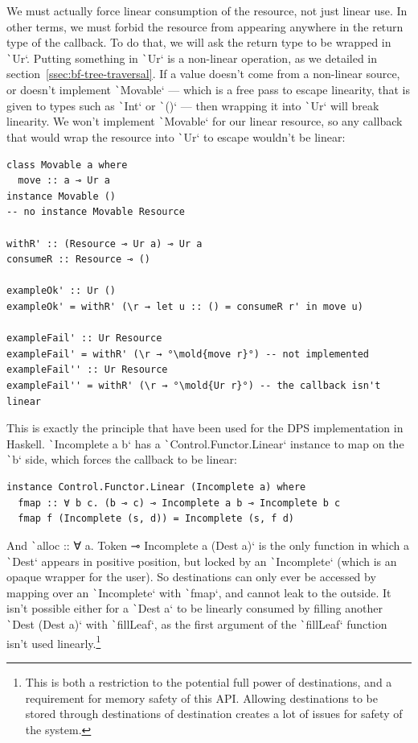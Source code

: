 \documentclass[english]{jflart}
\newcommand{\mold}[1]{\colorbox{red}{#1}}
\begin{document}
We must actually force linear consumption of the resource, not just linear use. In other terms, we must forbid the resource from appearing anywhere in the return type of the callback. To do that, we will ask the return type to be wrapped in \texttt`Ur`. Putting something in \texttt`Ur` is a non-linear operation, as we detailed in section~\ref{ssec:bf-tree-traversal}. If a value doesn't come from a non-linear source, or doesn't implement \texttt`Movable` --- which is a free pass to escape linearity, that is given to types such as \texttt`Int` or \texttt`()` --- then wrapping it into \texttt`Ur` will break linearity. We won't implement \texttt`Movable` for our linear resource, so any callback that would wrap the resource into \texttt`Ur` to escape wouldn't be linear:
{\small
\begin{verbatim}
class Movable a where
  move :: a ⊸ Ur a
instance Movable ()
-- no instance Movable Resource

withR' :: (Resource ⊸ Ur a) ⊸ Ur a
consumeR :: Resource ⊸ ()

exampleOk' :: Ur ()
exampleOk' = withR' (\r → let u :: () = consumeR r' in move u)

exampleFail' :: Ur Resource
exampleFail' = withR' (\r → °\mold{move r}°) -- not implemented
exampleFail'' :: Ur Resource
exampleFail'' = withR' (\r → °\mold{Ur r}°) -- the callback isn't linear
\end{verbatim}
}

This is exactly the principle that have been used for the DPS implementation in Haskell. \texttt`Incomplete a b` has a \texttt`Control.Functor.Linear` instance to map on the \texttt`b` side, which forces the callback to be linear:

{\small
\begin{verbatim}
instance Control.Functor.Linear (Incomplete a) where
  fmap :: ∀ b c. (b ⊸ c) ⊸ Incomplete a b ⊸ Incomplete b c
  fmap f (Incomplete (s, d)) = Incomplete (s, f d)
\end{verbatim}
}

And \texttt`alloc :: ∀ a. Token ⊸ Incomplete a (Dest a)` is the only function in which a \texttt`Dest` appears in positive position, but locked by an \texttt`Incomplete` (which is an opaque wrapper for the user). So destinations can only ever be accessed by mapping over an \texttt`Incomplete` with \texttt`fmap`, and cannot leak to the outside. It isn't possible either for a \texttt`Dest a` to be linearly consumed by filling another \texttt`Dest (Dest a)` with \texttt`fillLeaf`, as the first argument of the \texttt`fillLeaf` function isn't used linearly.\footnote{This is both a restriction to the potential full power of destinations, and a requirement for memory safety of this API. Allowing destinations to be stored through destinations of destination creates a lot of issues for safety of the system.}
\end{document}
